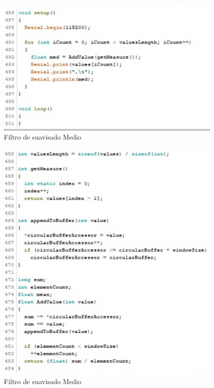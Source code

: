 \documentclass[10pt,a4paper]{article}
\begin{document}
\begin{multicols}{2}
\begin{itemize}
\begin{figure}[H]
\centering
\includegraphics[scale=0.65]{codmedtwo.PNG}
\caption{Filtro de suavisado Medio}
\end{figure}


\begin{figure}[H]
\centering
\includegraphics[scale=0.65]{codmedone.PNG}
\caption{Filtro de suavisado Medio}
\end{figure}



\end{itemize}
\end{multicols}
\end{document}
